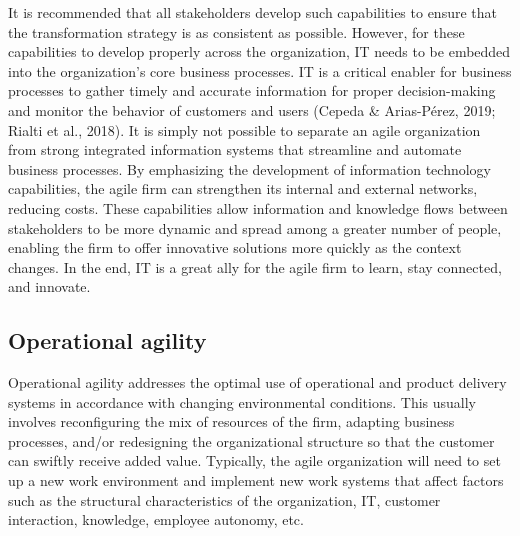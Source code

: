 \documentclass[
  letterpaper,
  DIV=11,
  numbers=noendperiod]{scrreprt}
\begin{document}
It is recommended that all stakeholders develop such capabilities to
ensure that the transformation strategy is as consistent as possible.
However, for these capabilities to develop properly across the
organization, IT needs to be embedded into the organization's core
business processes. IT is a critical enabler for business processes to
gather timely and accurate information for proper decision-making and
monitor the behavior of customers and users (Cepeda \& Arias-Pérez,
2019; Rialti et al., 2018). It is simply not possible to separate an
agile organization from strong integrated information systems that
streamline and automate business processes. By emphasizing the
development of information technology capabilities, the agile firm can
strengthen its internal and external networks, reducing costs. These
capabilities allow information and knowledge flows between stakeholders
to be more dynamic and spread among a greater number of people, enabling
the firm to offer innovative solutions more quickly as the context
changes. In the end, IT is a great ally for the agile firm to learn,
stay connected, and innovate.

\hypertarget{operational-agility}{%
\subsection{Operational agility}\label{operational-agility}}

Operational agility addresses the optimal use of operational and product
delivery systems in accordance with changing environmental conditions.
This usually involves reconfiguring the mix of resources of the firm,
adapting business processes, and/or redesigning the organizational
structure so that the customer can swiftly receive added value.
Typically, the agile organization will need to set up a new work
environment and implement new work systems that affect factors such as
the structural characteristics of the organization, IT, customer
interaction, knowledge, employee autonomy, etc.
\end{document}
